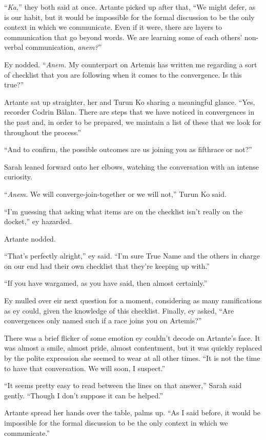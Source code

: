 ``\emph{Ka,}'' they both said at once. Artante picked up after that, ``We might defer, as is our habit, but it would be impossible for the formal discussion to be the only context in which we communicate. Even if it were, there are layers to communication that go beyond words. We are learning some of each others' non-verbal communication, \emph{anem?}''

Ey nodded. ``\emph{Anem.} My counterpart on Artemis has written me regarding a sort of checklist that you are following when it comes to the convergence. Is this true?''

Artante sat up straighter, her and Turun Ko sharing a meaningful glance. ``Yes, recorder Codrin Bălan. There are steps that we have noticed in convergences in the past and, in order to be prepared, we maintain a list of these that we look for throughout the process.''

``And to confirm, the possible outcomes are us joining you as fifthrace or not?''

Sarah leaned forward onto her elbows, watching the conversation with an intense curiosity.

``\emph{Anem.} We will converge-join-together or we will not,'' Turun Ko said.

``I'm guessing that asking what items are on the checklist isn't really on the docket,'' ey hazarded.

Artante nodded.

``That's perfectly alright,'' ey said. ``I'm sure True Name and the others in charge on our end had their own checklist that they're keeping up with.''

``If you have wargamed, as you have said, then almost certainly.''

Ey mulled over eir next question for a moment, considering as many ramifications as ey could, given the knowledge of this checklist. Finally, ey asked, ``Are convergences only named such if a race joins you on Artemis?''

There was a brief flicker of some emotion ey couldn't decode on Artante's face. It was almost a smile, almost pride, almost contentment, but it was quickly replaced by the polite expression she seemed to wear at all other times. ``It is not the time to have that conversation. We will soon, I suspect.''

``It seems pretty easy to read between the lines on that answer,'' Sarah said gently. ``Though I don't suppose it can be helped.''

Artante spread her hands over the table, palms up. ``As I said before, it would be impossible for the formal discussion to be the only context in which we communicate.''

